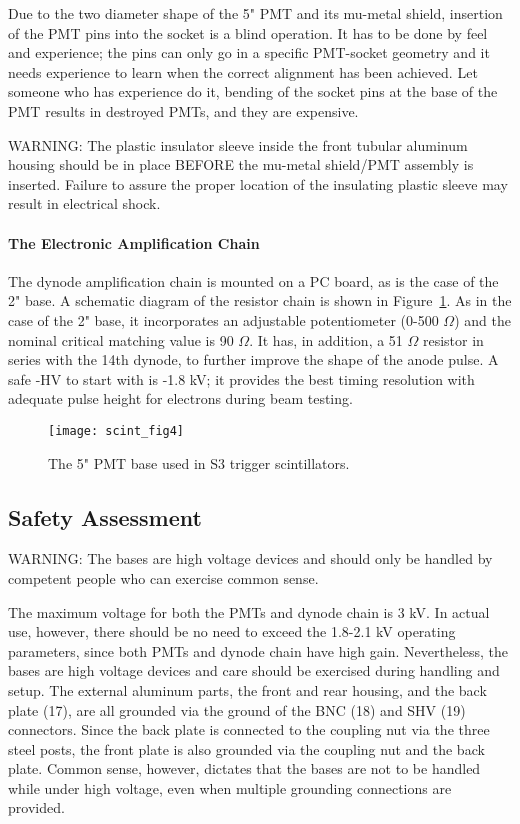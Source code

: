 Due to the two diameter shape of the 5" PMT and its mu-metal shield, insertion  
of the PMT pins into the socket is a blind operation. It has to be done by feel 
and experience; the pins can only go in a specific PMT-socket geometry and it 
needs experience to learn when the correct alignment has been achieved. Let 
someone who has experience do it, bending of the socket pins at the base of the 
PMT results in destroyed PMTs, and they are expensive.

WARNING: The plastic insulator sleeve inside the front tubular aluminum 
housing should be in place BEFORE the mu-metal shield/PMT assembly is inserted. 
Failure to assure the proper location of the insulating plastic sleeve may 
result in electrical shock.
 
\paragraph{The Electronic Amplification Chain}

The dynode amplification chain is mounted on a PC board, as is the case of the 
2" base. A schematic diagram of the resistor chain is shown in 
Figure~\ref{fig:scint_4}. As in 
the case of the 2" base, it incorporates an adjustable potentiometer (0-500 
$\Omega$) and the nominal critical matching value is 90 $\Omega$. It has, in addition, a 
51 $\Omega$ resistor in series with the 14th dynode, to further improve the shape of 
the anode pulse. A safe -HV to start with is -1.8 kV; it provides the best 
timing resolution with adequate pulse height for electrons during beam 
testing.

\begin{figure}[tbh]
\begin{center}
\texttt{[image: scint\_fig4]}
{\linespread{1.}
\caption[Detectors: 5'' PMT Base]{The 5" PMT base used in S3 trigger scintillators.}
\label{fig:scint_4}}
\end{center}
\end{figure}


\subsection{Safety Assessment}

WARNING: The bases are high voltage devices and should only be handled by 
competent people who can exercise common sense.

   The maximum voltage for both the PMTs and dynode chain is 3 kV. In actual 
use, however, there should be no need to exceed the 1.8-2.1 kV operating 
parameters, since both PMTs and dynode chain have high gain. Nevertheless, the 
bases are high voltage devices and care should be exercised during handling and 
setup. The external aluminum parts, the front and rear housing, and the back 
plate (17), are all grounded via the ground of the BNC (18) and SHV (19) 
connectors. Since the back plate is connected to the coupling nut via the three 
steel posts, the front plate is also grounded via the coupling nut and the back 
plate. Common sense, however, dictates that the bases are not to be handled     
while under high voltage, even when multiple grounding connections are provided.

